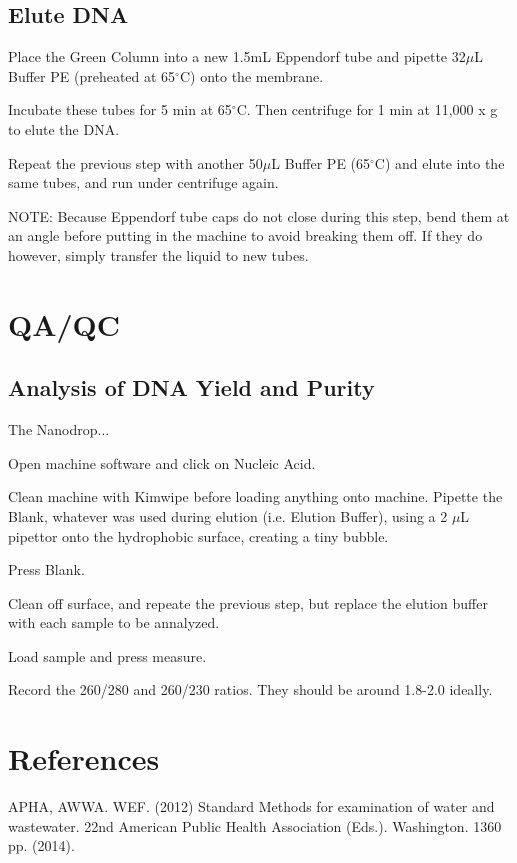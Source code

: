 \documentclass[12pt]{../SOP3_alpha}\usepackage[]{graphicx}\usepackage[]{color}
\begin{document}
\subsection*{Elute DNA}

\NP Place the Green Column into a new 1.5mL Eppendorf tube and pipette 32$\mu$L Buffer PE (preheated at 65$^\circ$C) onto the membrane. 

\NP Incubate these tubes for 5 min at 65$^\circ$C. Then centrifuge for 1 min at 11,000 x g to elute the DNA.

\NP Repeat the previous step with another 50$\mu$L Buffer PE (65$^\circ$C) and elute into the same tubes, and run under centrifuge again.

\NP NOTE: Because Eppendorf tube caps do not close during this step, bend them at an angle before putting in the machine to avoid breaking them off. If they do however, simply transfer the liquid to new tubes.


\section{QA/QC}

\subsection*{Analysis of DNA Yield and Purity}

\NP The Nanodrop...

\NP Open machine software and click on Nucleic Acid.

\NP Clean machine with Kimwipe before loading anything onto machine. 
\NP Pipette the Blank, whatever was used during elution (i.e. Elution Buffer), using a 2 $\mu$L pipettor onto the hydrophobic surface, creating a tiny bubble.

\NP Press Blank.

\NP Clean off surface, and repeate the previous step, but replace the elution buffer with each sample to be annalyzed.

\NP Load sample and press measure.

\NP Record the 260/280 and 260/230 ratios. They should be around 1.8-2.0 ideally. 

\section{References}

\NP APHA, AWWA. WEF. (2012) Standard Methods for examination of water and wastewater. 22nd American Public Health Association (Eds.). Washington. 1360 pp. (2014).
\end{document}
